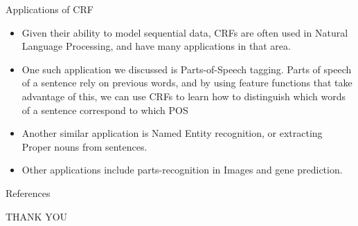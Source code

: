 \documentclass[10pt]{beamer}
\theoremstyle{remark}
\theoremstyle{definition}
\begin{document}
\begin{frame}{Applications of CRF}
\nocite{}
\begin{itemize}
    \item Given their ability to model sequential data, CRFs are often used in Natural Language Processing, and have many applications in that area.
    \item One such application we discussed is Parts-of-Speech tagging. Parts of speech of a sentence rely on previous words, and by using feature functions that take advantage of this, we can use CRFs to learn how to distinguish which words of a sentence correspond to which POS
    \item Another similar application is Named Entity recognition, or extracting Proper nouns from sentences.
    \item Other applications include parts-recognition in Images and gene prediction.
\end{itemize}
\end{frame}
\begin{frame}[allowframebreaks]{References}
\printbibliography
\end{frame}
\begin{frame}{}
    \textsc{\huge THANK YOU}
\end{frame}
\end{document}
